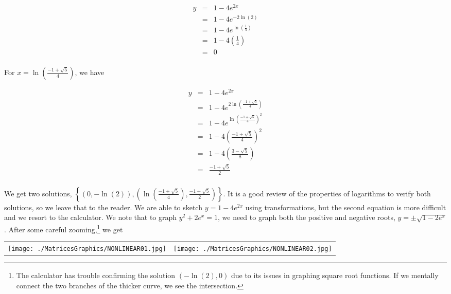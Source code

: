 \begin{ex}
\begin{enumerate}
\[ \begin{array}{rcl}

y & = & 1 - 4e^{2x}\\
  & = & 1 - 4e^{-2\ln(2)} \\
  & = & 1 - 4e^{\ln\left(\frac{1}{4}\right)} \\
  & = & 1 - 4\left(\frac{1}{4}\right) \\
  & = & 0 \\
\end{array} \]

For $x = \ln\left(\frac{-1 + \sqrt{5}}{4}\right)$,  we have

\[ \begin{array}{rcl}

y & = & 1 - 4e^{2x} \\
  & = & 1 - 4e^{2\ln\left(\frac{-1 + \sqrt{5}}{4}\right)} \\
  & = & 1 - 4e^{\ln\left(\frac{-1 + \sqrt{5}}{4}\right)^2} \\
  & = & 1 - 4\left( \frac{-1 + \sqrt{5}}{4} \right)^2 \\
  & = & 1 - 4\left(\frac{3-\sqrt{5}}{8}\right) \\
  &  = & \frac{-1+\sqrt{5}}{2}\\

\end{array}\]

We get two solutions, $\left\{ (0,-\ln(2)), \left(\ln\left(\frac{-1 + \sqrt{5}}{4}\right),\frac{-1+\sqrt{5}}{2}\right) \right\}$.  It is a good review of the properties of logarithms to verify both solutions, so we leave that to the reader.  We are able to sketch $y = 1 - 4e^{2x}$ using transformations, but the second equation is more difficult and  we resort to the calculator.  We note that to graph $y^2 + 2e^{x} = 1$, we need to graph both the positive and negative roots, $y = \pm \sqrt{1-2e^{x}}$.  After some careful zooming,\footnote{The calculator has trouble confirming the solution $(-\ln(2),0)$ due to its issues in graphing square root functions.  If we mentally connect the two branches of the thicker curve,  we see the intersection.} we get

\begin{center}

\begin{tabular}{cc}

\texttt{[image: ./MatricesGraphics/NONLINEAR01.jpg]} &

\hspace{0.75in} \texttt{[image: ./MatricesGraphics/NONLINEAR02.jpg]}  \\


\end{tabular}
\end{center}
\end{enumerate}
\end{ex}
